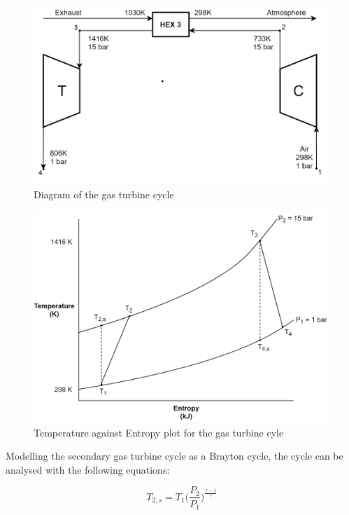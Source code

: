 \documentclass{article}
\begin{document}
\begin{figure}[h]
    \centering
    \includegraphics[scale=0.8]{GasCycle.png}
    \caption{Diagram of the gas turbine cycle}
    \label{LMfig:gascycle}
\end{figure}


\begin{figure}[h!]
    \centering
    \includegraphics[scale=0.8]{TSplot.png}
    \caption{Temperature against Entropy plot for the gas turbine cyle}
    \label{LMfig:TSplot}
\end{figure}


Modelling the secondary gas turbine cycle as a Brayton cycle, the cycle can be analysed with the following equations:

\begin{equation}
T_{2,s}= T_1 \Big (\frac{P_2}{P_1} \Big )^{\frac{\gamma-1}{\gamma}}					
\end{equation}
\end{document}
